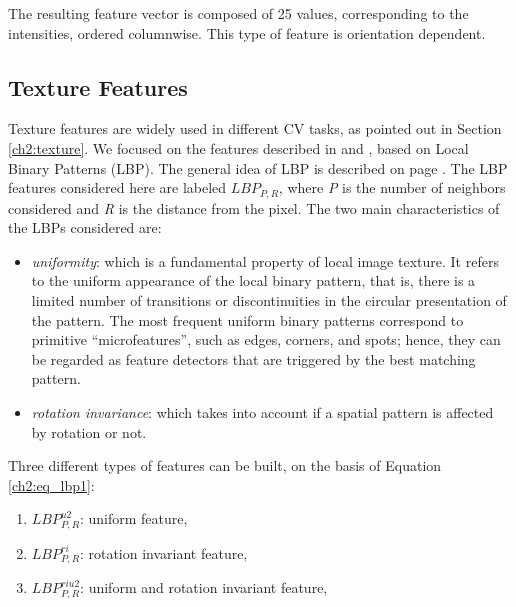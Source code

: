 The resulting feature vector is composed of 25 values, corresponding to the intensities, ordered columnwise. This type of feature is orientation dependent.



\vspace{0.5cm}

\subsection{Texture Features}
\label{ch4:tf}

Texture features are widely used in different \Gls{CV} tasks, as pointed out in Section \ref{ch2:texture}. We focused on the features described in \cite{LBP01} and \cite{LBP02},
based on Local Binary Patterns (\Gls{LBP}). The general idea of \Gls{LBP} is described on page \pageref{ch2:lbp}.
The \Gls{LBP} features considered here are labeled $LBP_{P,R}$, where \textit{P} is the number of neighbors considered and \textit{R} is the distance from the pixel.
The two main characteristics of the \Glspl{LBP} considered are:

\begin{itemize}
 \item \textit{uniformity}: which is a fundamental property of local image texture. It refers to the uniform appearance of the local
binary pattern, that is, there is a limited number of transitions or discontinuities in the circular presentation of the pattern.
The most frequent uniform binary patterns correspond to primitive \textquotedblleft microfeatures\textquotedblright, such
as edges, corners, and spots; hence, they can be regarded as feature detectors that are triggered by the best matching
pattern.
\item \textit{rotation invariance}: which takes into account if a spatial pattern is affected by rotation or not.
\end{itemize}

Three different types of features can be built, on the basis of Equation \ref{ch2:eq_lbp1}:

\begin{enumerate}
 \item $LBP_{P,R}^{u2}$: uniform feature,
 \item $LBP_{P,R}^{ri}$: rotation invariant feature,
 \item $LBP_{P,R}^{riu2}$: uniform and rotation invariant feature,
\end{enumerate}

